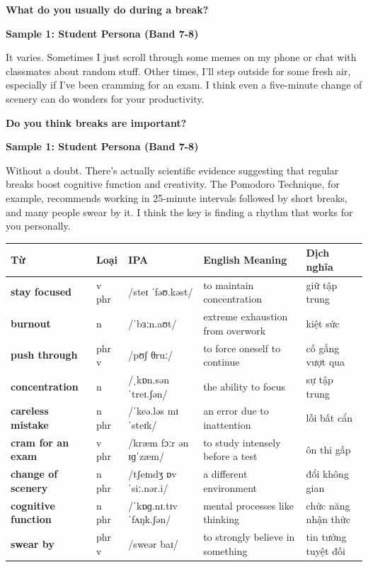 \separator

\begin{ieltsquestion}
\textbf{What do you usually do during a break?}
\end{ieltsquestion}
\textbf{Sample 1: Student Persona (Band 7-8)}

It varies. Sometimes I just scroll through some memes on my phone or chat with classmates about random stuff. Other times, I'll step outside for some fresh air, especially if I've been cramming for an exam. I think even a five-minute change of scenery can do wonders for your productivity.

\separator

\begin{ieltsquestion}
\textbf{Do you think breaks are important?}
\end{ieltsquestion}
\textbf{Sample 1: Student Persona (Band 7-8)}

Without a doubt. There's actually scientific evidence suggesting that regular breaks boost cognitive function and creativity. The Pomodoro Technique, for example, recommends working in 25-minute intervals followed by short breaks, and many people swear by it. I think the key is finding a rhythm that works for you personally.

\separator


\vspace{0.8em}
\begin{center}
\renewcommand{\arraystretch}{1.65}
\begin{tabularx}{\textwidth}{|V{0.22\textwidth}|C{0.07\textwidth}|I{0.20\textwidth}|Y|V{0.18\textwidth}|}
\hline
{}
\textbf{Từ} & \textbf{Loại} & \textbf{IPA} & \textbf{English Meaning} & \textbf{Dịch nghĩa} \\
\hline
\textbf{stay focused} & v phr & /steɪ ˈfəʊ.kəst/ & to maintain concentration & giữ tập trung \\ \hline
\textbf{burnout} & n & /ˈbɜːn.aʊt/ & extreme exhaustion from overwork & kiệt sức \\ \hline
\textbf{push through} & phr v & /pʊʃ θruː/ & to force oneself to continue & cố gắng vượt qua \\ \hline
\textbf{concentration} & n & /ˌkɒn.sənˈtreɪ.ʃən/ & the ability to focus & sự tập trung \\ \hline
\textbf{careless mistake} & n phr & /ˈkeə.ləs mɪˈsteɪk/ & an error due to inattention & lỗi bất cẩn \\ \hline
\textbf{cram for an exam} & v phr & /kræm fɔːr ən ɪɡˈzæm/ & to study intensely before a test & ôn thi gấp \\ \hline
\textbf{change of scenery} & n phr & /tʃeɪndʒ ɒv ˈsiː.nər.i/ & a different environment & đổi không gian \\ \hline
\textbf{cognitive function} & n phr & /ˈkɒɡ.nɪ.tɪv ˈfʌŋk.ʃən/ & mental processes like thinking & chức năng nhận thức \\ \hline
\textbf{swear by} & phr v & /sweər baɪ/ & to strongly believe in something & tin tưởng tuyệt đối \\ \hline
\end{tabularx}
\end{center}

